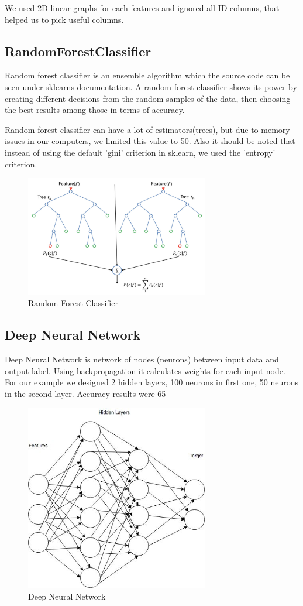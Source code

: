 \documentclass[a4paper, 10pt, conference]{ieeeconf}
\begin{document}
We used 2D linear graphs for each features and ignored all ID columns, that helped us to pick useful columns.

\subsection{RandomForestClassifier}

Random forest classifier is an ensemble algorithm which the source code can be seen under sklearns documentation. A random forest classifier shows its power by creating different decisions from the random samples of the data, then choosing the best results among those in terms of accuracy.

Random forest classifier can have a lot of estimators(trees), but due to memory issues in our computers, we limited this value to 50. Also it should be noted that instead of using the default 'gini' criterion in sklearn, we used the 'entropy' criterion.

\begin{figure}[ht]
\centering
\includegraphics[width=8cm]{randomforest}
\caption{Random Forest Classifier}
\end{figure}

\subsection{Deep Neural Network}

Deep Neural Network is network of nodes (neurons) between input data and output label. Using backpropagation it calculates weights for each input node. For our example we designed 2 hidden layers, 100 neurons in first one, 50 neurons in the second layer. Accuracy results were 65%

\begin{figure}[ht]
\centering
\includegraphics[width=8cm]{DNN}
\caption{Deep Neural Network}
\end{figure}
\end{document}
